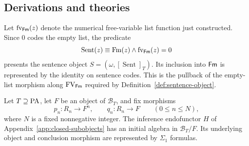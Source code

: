 \subsection{Derivations and theories}
\label{subsec:syntactic-theories}

Let $\operatorname{fv}_{\mathsf{Fm}}(z)$ denote the numerical free-variable
list function just constructed. Since $0$ codes the empty list,
the predicate
\[
 \operatorname{Sent}(z)\equiv
 \operatorname{Fm}(z)\land\operatorname{fv}_{\mathsf{Fm}}(z)=0
\]
presents the sentence object
$S=(\omega,[\operatorname{Sent}]_T)$. Its inclusion into $\mathsf{Fm}$
is represented by the identity on sentence codes. This is the
pullback of the empty-list morphism along $\operatorname{FV}_{\mathsf{Fm}}$ required
by Definition~\ref{def:sentence-object}.

\begin{lemma}\label{lem:syntactic-derivation-initiality}
Let $T\supseteq\mathrm{PA}$, let $F$ be an object of $\mathcal B_T$, and
fix morphisms
\[
 p_n:R_n\longrightarrow F^n,\qquad
 q_n:R_n\longrightarrow F\qquad(0\leq n\leq N),
\]
where $N$ is a fixed nonnegative integer.
The inference endofunctor $H$ of
Appendix~\ref{app:closed-subobjects} has an initial algebra in
$\mathcal B_T/F$.  Its underlying object and conclusion morphism
are represented by $\Sigma_1$ formulas.
\end{lemma}
